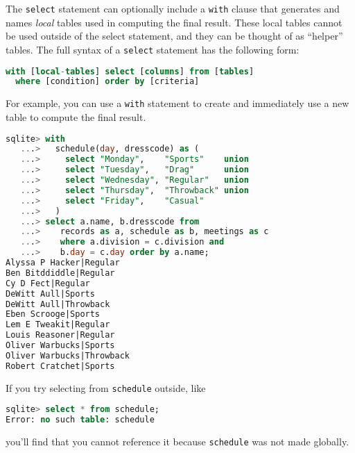 The \texttt{select} statement can optionally include a \texttt{with} clause that
generates and names \textit{local} tables used in computing the final result.
These local tables cannot be used outside of the select statement, and they can
be thought of as ``helper'' tables.
The full syntax of a \texttt{select} statement has the following form:
\begin{lstlisting}[language=SQL]
with [local-tables] select [columns] from [tables]
  where [condition] order by [criteria]
\end{lstlisting}

For example, you can use a \texttt{with} statement to create and immediately use
a new table to compute the final result.

\begin{lstlisting}[language=SQL]
sqlite> with
   ...>   schedule(day, dresscode) as (
   ...>     select "Monday",    "Sports"    union
   ...>     select "Tuesday",   "Drag"      union
   ...>     select "Wednesday", "Regular"   union
   ...>     select "Thursday",  "Throwback" union
   ...>     select "Friday",    "Casual"
   ...>   )
   ...> select a.name, b.dresscode from 
   ...>    records as a, schedule as b, meetings as c
   ...>    where a.division = c.division and 
   ...>    b.day = c.day order by a.name;
Alyssa P Hacker|Regular
Ben Bitddiddle|Regular
Cy D Fect|Regular
DeWitt Aull|Sports
DeWitt Aull|Throwback
Eben Scrooge|Sports
Lem E Tweakit|Regular
Louis Reasoner|Regular
Oliver Warbucks|Sports
Oliver Warbucks|Throwback
Robert Cratchet|Sports
\end{lstlisting}

If you try selecting from \texttt{schedule} outside, like
\begin{lstlisting}[language=SQL]
sqlite> select * from schedule;
Error: no such table: schedule
\end{lstlisting}
you'll find that you cannot reference it because \texttt{schedule} was not made
globally.
